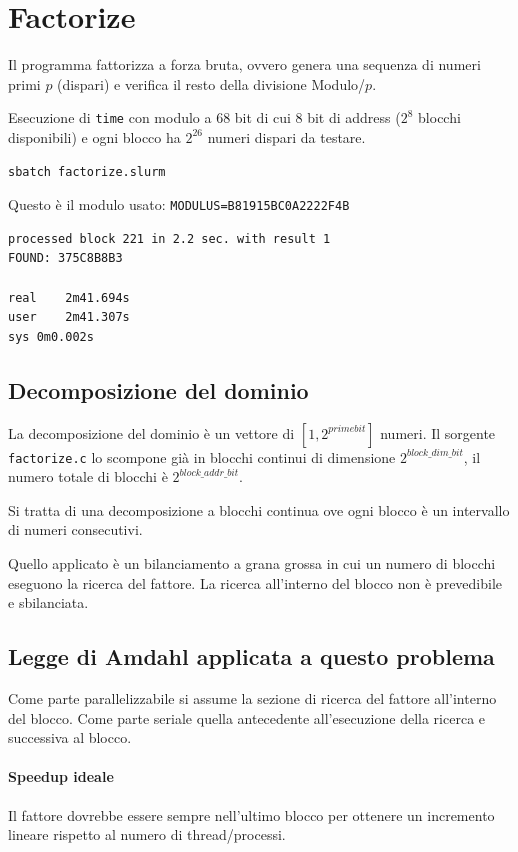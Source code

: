 \documentclass[11pt,a4paper]{article}
\begin{document}
\section{Factorize}

Il programma fattorizza a forza bruta, ovvero genera una sequenza di numeri primi $p$ (dispari) e verifica il resto della divisione Modulo/$p$.

Esecuzione di \texttt{time} con modulo a 68 bit di cui 8 bit di address ($2^8$ blocchi disponibili) e ogni blocco ha $2^{26}$ numeri dispari da testare.

\begin{lstlisting}
sbatch factorize.slurm
\end{lstlisting}

Questo è il modulo usato: \texttt{MODULUS=B81915BC0A2222F4B}

\begin{lstlisting}
processed block 221 in 2.2 sec. with result 1
FOUND: 375C8B8B3

real	2m41.694s
user	2m41.307s
sys	0m0.002s
\end{lstlisting}

\subsection{Decomposizione del dominio}

La decomposizione del dominio è un vettore di $[1,2^{primebit}]$ numeri.
Il sorgente \texttt{factorize.c} lo scompone già in blocchi continui di dimensione $2^{block\_dim\_bit}$, il numero totale di blocchi è $2^{block\_addr\_bit}$.

Si tratta di una decomposizione a blocchi continua ove ogni blocco è un intervallo di numeri consecutivi.

Quello applicato è un bilanciamento a grana grossa in cui un numero di blocchi eseguono la ricerca del fattore. La ricerca all'interno del blocco non è prevedibile e sbilanciata.

\subsection{Legge di Amdahl applicata a questo problema}

Come parte parallelizzabile si assume la sezione di ricerca del fattore all'interno del blocco.
Come parte seriale quella antecedente all'esecuzione della ricerca e successiva al blocco.

\paragraph{Speedup ideale} Il fattore dovrebbe essere sempre nell'ultimo blocco per ottenere un incremento lineare rispetto al numero di thread/processi.
\end{document}
